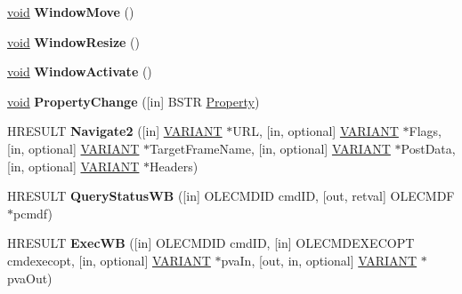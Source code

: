 \begin{DoxyCompactItemize}
\item 
\mbox{\label{interface_s_h_doc_vw_1_1uuid_a8d7caaf0d851086ca7c916d2cbe449e6}} 
\hyperlink{interfacevoid}{void} {\bfseries Window\+Move} ()
\item 
\mbox{\label{interface_s_h_doc_vw_1_1uuid_a12d0bbf165612b1ade4f5db8a6db7126}} 
\hyperlink{interfacevoid}{void} {\bfseries Window\+Resize} ()
\item 
\mbox{\label{interface_s_h_doc_vw_1_1uuid_ad0595dd424505fc336e7006ff38a5cd5}} 
\hyperlink{interfacevoid}{void} {\bfseries Window\+Activate} ()
\item 
\mbox{\label{interface_s_h_doc_vw_1_1uuid_a8e53bd407ff6dcd6fed27c4b2258d865}} 
\hyperlink{interfacevoid}{void} {\bfseries Property\+Change} (\mbox{[}in\mbox{]} B\+S\+TR \hyperlink{struct_property}{Property})
\item 
\mbox{\label{interface_s_h_doc_vw_1_1uuid_aff4510afbb0c6db899d5482d083919bc}} 
H\+R\+E\+S\+U\+LT {\bfseries Navigate2} (\mbox{[}in\mbox{]} \hyperlink{structtag_v_a_r_i_a_n_t}{V\+A\+R\+I\+A\+NT} $\ast$U\+RL, \mbox{[}in, optional\mbox{]} \hyperlink{structtag_v_a_r_i_a_n_t}{V\+A\+R\+I\+A\+NT} $\ast$Flags, \mbox{[}in, optional\mbox{]} \hyperlink{structtag_v_a_r_i_a_n_t}{V\+A\+R\+I\+A\+NT} $\ast$Target\+Frame\+Name, \mbox{[}in, optional\mbox{]} \hyperlink{structtag_v_a_r_i_a_n_t}{V\+A\+R\+I\+A\+NT} $\ast$Post\+Data, \mbox{[}in, optional\mbox{]} \hyperlink{structtag_v_a_r_i_a_n_t}{V\+A\+R\+I\+A\+NT} $\ast$Headers)
\item 
\mbox{\label{interface_s_h_doc_vw_1_1uuid_a6a2401a93ea80c01bf859f8b5b7a18ab}} 
H\+R\+E\+S\+U\+LT {\bfseries Query\+Status\+WB} (\mbox{[}in\mbox{]} O\+L\+E\+C\+M\+D\+ID cmd\+ID, \mbox{[}out, retval\mbox{]} O\+L\+E\+C\+M\+DF $\ast$pcmdf)
\item 
\mbox{\label{interface_s_h_doc_vw_1_1uuid_ae39c96b3d2110c5b0d6fabe0ba343097}} 
H\+R\+E\+S\+U\+LT {\bfseries Exec\+WB} (\mbox{[}in\mbox{]} O\+L\+E\+C\+M\+D\+ID cmd\+ID, \mbox{[}in\mbox{]} O\+L\+E\+C\+M\+D\+E\+X\+E\+C\+O\+PT cmdexecopt, \mbox{[}in, optional\mbox{]} \hyperlink{structtag_v_a_r_i_a_n_t}{V\+A\+R\+I\+A\+NT} $\ast$pva\+In, \mbox{[}out, in, optional\mbox{]} \hyperlink{structtag_v_a_r_i_a_n_t}{V\+A\+R\+I\+A\+NT} $\ast$pva\+Out)

\end{DoxyCompactItemize}
